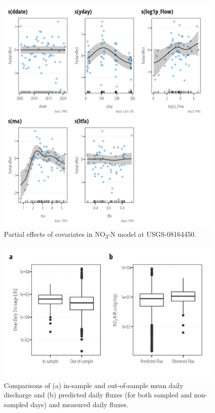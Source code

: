 \documentclass[
]{article}
\begin{document}
\begin{figure}[h]

{\centering \includegraphics{model_assessment_files/figure-pdf/unnamed-chunk-29-1.png}

}

\caption{Partial effects of covariates in NO\textsubscript{3}-N model at
USGS-08164450.}

\end{figure}

\begin{figure}[h]

{\centering \includegraphics{model_assessment_files/figure-pdf/unnamed-chunk-30-1.png}

}

\caption{Comparisons of (a) in-sample and out-of-sample mean daily
discharge and (b) predicted daily fluxes (for both sampled and
non-sampled days) and measured daily fluxes.}

\end{figure}
\end{document}
